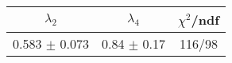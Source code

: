 \begin{tabular}{c|c||c}
$\lambda_{2}$ & $\lambda_4$ & $\chi^{2}$/ndf \\
\hline
0.583 $\pm$ 0.073 & 0.84 $\pm$ 0.17 & 116/98\\
\end{tabular}
